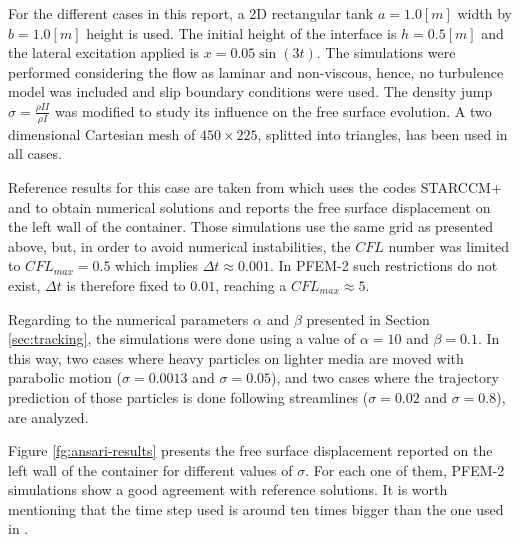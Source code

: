 For the different cases in this report, a 2D rectangular tank $a=1.0[m]$ width by $b=1.0[m]$ height is used. The initial height of the interface is $h=0.5[m]$ and the lateral excitation applied is $x=0.05\sin(3t)$. The simulations were performed considering the flow as laminar and non-viscous, hence, no turbulence model was included and slip boundary conditions were used. The density jump $\sigma=\frac{\rho{II}}{\rho{I}}$ was modified to study its influence on the free surface evolution. A two dimensional Cartesian mesh of $450\times225$, splitted into triangles, has been used in all cases.

Reference results for this case are taken from \cite{Goni13} which uses the codes STARCCM+ and \OF to obtain numerical solutions and reports the free surface displacement on the left wall of the container. Those simulations use the same grid as presented above, but, in order to avoid numerical instabilities, the $CFL$ number was limited to $CFL_{max}=0.5$ which implies $\Delta t \approx 0.001$. In PFEM-2 such restrictions do not exist, $\Delta t$ is therefore fixed to $0.01$, reaching a $CFL_{max}\approx5$.

Regarding to the numerical parameters $\alpha$ and $\beta$ presented in Section \ref{sec:tracking}, the simulations were done using a value of $\alpha=10$ and $\beta=0.1$. In this way, two cases where heavy particles on lighter media are moved with parabolic motion ($\sigma=0.0013$ and $\sigma=0.05$), and two cases where the trajectory prediction of those particles is done following streamlines ($\sigma=0.02$ and $\sigma=0.8$), are analyzed.

Figure \ref{fg:ansari-results} presents the free surface displacement reported on the left wall of the container for different values of $\sigma$. For each one of them, PFEM-2 simulations show a good agreement with reference solutions. It is worth mentioning that the time step used is around ten times bigger than the one used in \cite{Goni13}. 


